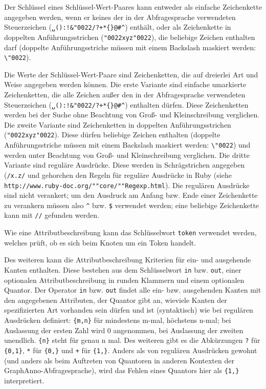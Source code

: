 \documentclass[12pt]{scrartcl}
\newcommand{\quo}{\char"0022}
\begin{document}
Der Schlüssel eines Schlüssel-Wert-Paares kann entweder als einfache Zeichenkette angegeben werden, wenn er keines der in der Abfragesprache verwendeten Steuerzeichen (\texttt{␣():!\&\quo/?+*\{\}@\#\^{}}) enthält, oder als Zeichenkette in doppelten Anführungsstrichen (\texttt{{\quo}xyz\quo}), die beliebige Zeichen enthalten darf (doppelte Anführungsstriche müssen mit einem Backslash maskiert werden: \texttt{\textbackslash\quo}).

\label{zeichenketten}Die Werte der Schlüssel-Wert-Paare sind Zeichenketten, die auf dreierlei Art und Weise angegeben werden können. Die erste Variante sind einfache umarkierte Zeichenketten, die alle Zeichen außer den in der Abfragesprache verwendeten Steuerzeichen (\texttt{␣():!\&\quo/?+*\{\}@\#\^{}}) enthalten dürfen. Diese Zeichenketten werden bei der Suche ohne Beachtung von Groß- und Kleinschreibung verglichen.
Die zweite Variante sind Zeichenketten in doppelten Anführungsstrichen (\texttt{{\quo}xyz\quo}). Diese dürfen beliebige Zeichen enthalten (doppelte Anführungsstriche müssen mit einem Backslash maskiert werden: \texttt{\textbackslash\quo}) und werden unter Beachtung von Groß- und Kleinschreibung verglichen. 
Die dritte Variante sind reguläre Ausdrücke. Diese werden in Schrägstrichen angegeben (\texttt{/x.z/} und gehorchen den Regeln für reguläre Ausdrücke in Ruby (siehe \texttt{http://www.ruby-doc.org/""core/""Regexp.html}). Die regulären Ausdrücke sind nicht verankert; um den Ausdruck am Anfang bzw. Ende einer Zeichenkette zu verankern müssen also \texttt{\^} bzw. \texttt{\$} verwendet werden; eine beliebige Zeichenkette kann mit \texttt{//} gefunden werden.

Wie eine Attributbeschreibung kann das Schlüsselwort \texttt{token} verwendet werden, welches prüft, ob es sich beim Knoten um ein Token handelt.

Des weiteren kann die Attributbeschreibung Kriterien für ein- und ausgehende Kanten enthalten. Diese bestehen aus dem Schlüsselwort \texttt{in} bzw. \texttt{out}, einer optionalen Attributbeschreibung in runden Klammern und einem optionalen Quantor. Der Operator \texttt{in} bzw. \texttt{out} findet alle ein- bzw. ausgehenden Kanten mit den angegebenen Attributen, der Quantor gibt an, wieviele Kanten der spezifizierten Art vorhanden sein dürfen und ist (syntaktisch) wie bei regulären Ausdrücken definiert: \texttt{\{m,n\}} für mindestens m-mal, höchstens n-mal; bei Auslassung der ersten Zahl wird 0 angenommen, bei Auslassung der zweiten unendlich. \texttt{\{n\}} steht für genau n mal. Des weiteren gibt es die Abkürzungen \texttt{?} für \texttt{\{0,1\}}, \texttt{*} für \texttt{\{0,\}} und \texttt{+} für \texttt{\{1,\}}.
Anders als von regulären Ausdrücken gewohnt (und anders als beim Auftreten von Quantoren in anderen Kontexten der GraphAnno-Abfragesprache), wird das Fehlen eines Quantors hier als \texttt{\{1,\}} interpretiert.
\end{document}
